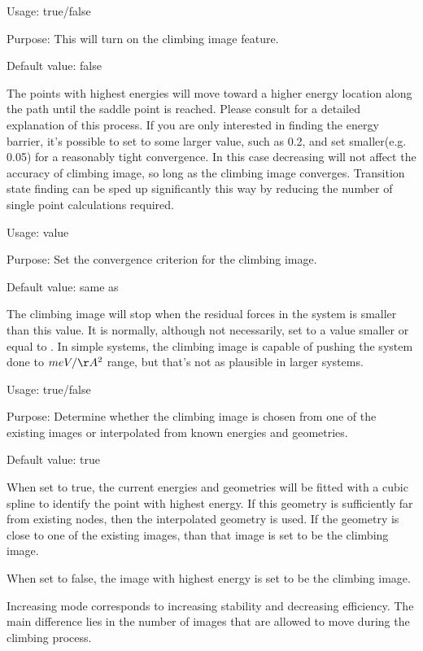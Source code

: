 {
Usage:  true/false


Purpose: This will turn on the climbing image\cite{HenkelmanJCP2000a} feature. 


Default value: false
}
The points with highest energies will move toward a higher energy location along the path until the saddle point is reached. Please consult  for a detailed explanation of this process. If you are only interested in finding the energy barrier, it's possible to set  to some larger value, such as 0.2, and set  smaller(e.g. 0.05) for a reasonably tight convergence. In this case decreasing  will not affect the accuracy of climbing image, so long as the climbing image converges. Transition state finding can be sped up significantly this way by reducing the number of single point calculations required. 

{
Usage:  value


Purpose: Set the convergence criterion for the climbing image. 

Default value: same as 
}
The climbing image will stop when the residual forces in the system is smaller than this value. It is normally, although not necessarily, set to a value smaller or equal to . In simple systems, the climbing image is capable of pushing the system done to $meV/\AA^{2}$ range, but that's not as plausible in larger systems.



{
Usage:  true/false


Purpose: Determine whether the climbing image is chosen from one of the existing images or interpolated from known energies and geometries. 


Default value: true
}

When set to true, the current energies and geometries will be fitted with a cubic spline to identify the point with highest energy. If this geometry is sufficiently far from existing nodes, then the interpolated geometry is used. If the geometry is close to one of the existing images, than that image is set to be the climbing image. 

When set to false, the image with highest energy is set to be the climbing image. 


Increasing mode corresponds to increasing stability and decreasing efficiency. The main difference lies in the number of images that are allowed to move during the climbing process. 


